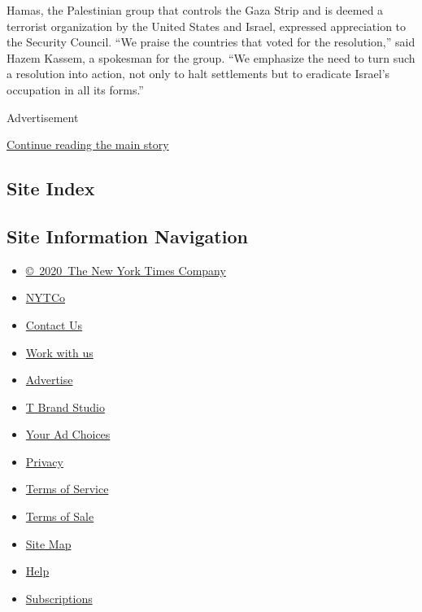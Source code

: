 Hamas, the Palestinian group that controls the Gaza Strip and is deemed
a terrorist organization by the United States and Israel, expressed
appreciation to the Security Council. ``We praise the countries that
voted for the resolution,'' said Hazem Kassem, a spokesman for the
group. ``We emphasize the need to turn such a resolution into action,
not only to halt settlements but to eradicate Israel's occupation in all
its forms.''

Advertisement

\protect\hyperlink{after-bottom}{Continue reading the main story}

\hypertarget{site-index}{%
\subsection{Site Index}\label{site-index}}

\hypertarget{site-information-navigation}{%
\subsection{Site Information
Navigation}\label{site-information-navigation}}

\begin{itemize}
\tightlist
\item
  \href{https://help.nytimes.com/hc/en-us/articles/115014792127-Copyright-notice}{©~2020~The
  New York Times Company}
\end{itemize}

\begin{itemize}
\tightlist
\item
  \href{https://www.nytco.com/}{NYTCo}
\item
  \href{https://help.nytimes.com/hc/en-us/articles/115015385887-Contact-Us}{Contact
  Us}
\item
  \href{https://www.nytco.com/careers/}{Work with us}
\item
  \href{https://nytmediakit.com/}{Advertise}
\item
  \href{http://www.tbrandstudio.com/}{T Brand Studio}
\item
  \href{https://www.nytimes.com/privacy/cookie-policy\#how-do-i-manage-trackers}{Your
  Ad Choices}
\item
  \href{https://www.nytimes.com/privacy}{Privacy}
\item
  \href{https://help.nytimes.com/hc/en-us/articles/115014893428-Terms-of-service}{Terms
  of Service}
\item
  \href{https://help.nytimes.com/hc/en-us/articles/115014893968-Terms-of-sale}{Terms
  of Sale}
\item
  \href{https://spiderbites.nytimes.com}{Site Map}
\item
  \href{https://help.nytimes.com/hc/en-us}{Help}
\item
  \href{https://www.nytimes.com/subscription?campaignId=37WXW}{Subscriptions}
\end{itemize}

